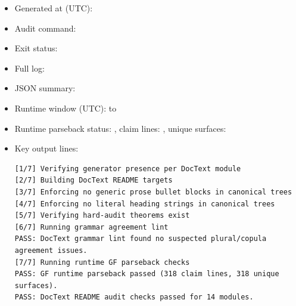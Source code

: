 \begin{itemize}
\item Generated at (UTC): 
\item Audit command: 
\item Exit status: 
\item Full log: 
\item JSON summary: 
\item Runtime window (UTC):  to 
\item Runtime parseback status: , claim lines: , unique surfaces: 
\item Key output lines:
\begin{lstlisting}
[1/7] Verifying generator presence per DocText module
[2/7] Building DocText README targets
[3/7] Enforcing no generic prose bullet blocks in canonical trees
[4/7] Enforcing no literal heading strings in canonical trees
[5/7] Verifying hard-audit theorems exist
[6/7] Running grammar agreement lint
PASS: DocText grammar lint found no suspected plural/copula agreement issues.
[7/7] Running runtime GF parseback checks
PASS: GF runtime parseback passed (318 claim lines, 318 unique surfaces).
PASS: DocText README audit checks passed for 14 modules.
\end{lstlisting}
\end{itemize}
